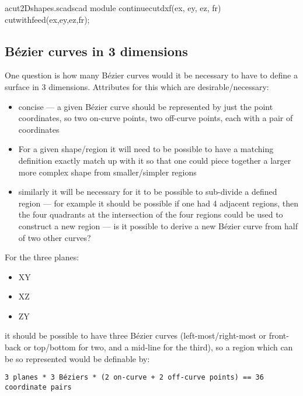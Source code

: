 \documentclass{ltxdoc}
\begin{document}
\lstset{firstnumber=\thecuttwod}
\begin{writecode}{a}{cut2Dshapes.scad}{scad}
module continuecutdxf(ex, ey, ez, fr) {
  cutwithfeed(ex,ey,ez,fr);
}

\end{writecode}
\addtocounter{cuttwod}{4}
 
\subsection{Bézier curves in 3 dimensions}
 
One question is how many Bézier curves would it be necessary to have to define a surface
in 3 dimensions. Attributes for this which are desirable/necessary:

\begin{itemize}
\item concise --- a given Bézier curve should be represented by just the point coordinates, 
      so two on-curve points, two off-curve points, each with a pair of coordinates
\item For a given shape/region it will need to be possible to have a matching definition 
      exactly match up with it so that one could piece together a larger more complex shape 
      from smaller/simpler regions
\item similarly it will be necessary for it to be possible to sub-divide a defined region --- 
      for example it should be possible if one had 4 adjacent regions, then the four quadrants 
      at the intersection of the four regions could be used to construct a new region --- is it
      possible to derive a new Bézier curve from half of two other curves?
\end{itemize}

\begin{samepage}
For the three planes:

\begin{itemize}
 \item XY
 \item XZ
 \item ZY
\end{itemize}
 
\noindent it should be possible to have three Bézier curves (left-most/right-most or front-back or 
top/bottom for two, and a mid-line for the third), so a region which can be so represented would 
be definable by:
 
\begin{verbatim}
3 planes * 3 Béziers * (2 on-curve + 2 off-curve points) == 36 coordinate pairs
\end{verbatim}
\end{samepage}
 
\end{document}
